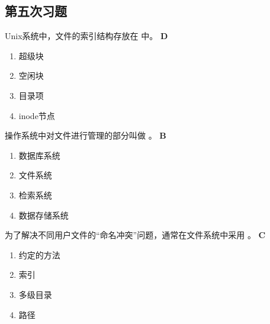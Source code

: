 \subsection*{第五次习题}
\setcounter{problemname}{0}

\begin{problem}
	Unix系统中，文件的索引结构存放在 \myline 中。
	\textbf{D}
	\vspace{-0.5em}
	\begin{multicols}{4}
		\begin{enumerate}[label=\Alph*.]
			\item 超级块
			\item 空闲块
			\item 目录项
			\item inode节点
		\end{enumerate}
	\end{multicols}
	\vspace{-1em}
\end{problem}


\begin{problem}
	操作系统中对文件进行管理的部分叫做 \myline。
	\textbf{B}
	\vspace{-0.5em}
	\begin{multicols}{4}
		\begin{enumerate}[label=\Alph*.]
			\item 数据库系统
			\item 文件系统
			\item 检索系统
			\item 数据存储系统
		\end{enumerate}
	\end{multicols}
	\vspace{-1em}
\end{problem}


\begin{problem}
	为了解决不同用户文件的“命名冲突”问题，通常在文件系统中采用 \myline。
	\textbf{C}
	\vspace{-0.5em}
	\begin{multicols}{4}
		\begin{enumerate}[label=\Alph*.]
			\item 约定的方法
			\item 索引
			\item 多级目录
			\item 路径
		\end{enumerate}
	\end{multicols}
	\vspace{-1em}
\end{problem}


